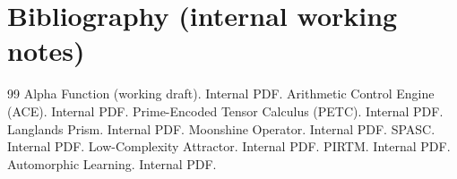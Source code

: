 \documentclass[11pt]{article}
\theoremstyle{remark}
\begin{document}
\section{Bibliography (internal working notes)}
\begin{thebibliography}{99}
 Alpha Function (working draft). Internal PDF.
 Arithmetic Control Engine (ACE). Internal PDF.
 Prime-Encoded Tensor Calculus (PETC). Internal PDF.
 Langlands Prism. Internal PDF.
 Moonshine Operator. Internal PDF.
 SPASC. Internal PDF.
 Low-Complexity Attractor. Internal PDF.
 PIRTM. Internal PDF.
 Automorphic Learning. Internal PDF.
\end{thebibliography}
\end{document}
